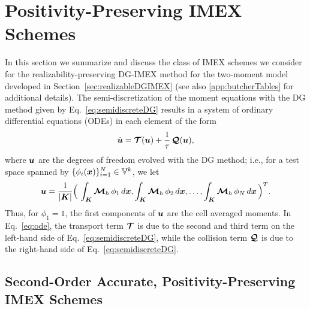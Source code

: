 \section{Positivity-Preserving IMEX Schemes}
\label{sec:imex}

In this section we summarize and discuss the class of IMEX schemes we consider for the realizability-preserving DG-IMEX method for the two-moment model developed in Section~\ref{sec:realizableDGIMEX} (see also \ref{app:butcherTables} for additional details).  
The semi-discretization of the moment equations with the DG method given by Eq.~\eqref{eq:semidiscreteDG} results in a system of ordinary differential equations (ODEs) in each element of the form
\begin{equation}
  \dot{\boldsymbol{u}}
  =\boldsymbol{\mathcal{T}}(\boldsymbol{u})+\frac{1}{\tau}\,\boldsymbol{\mathcal{Q}}(\boldsymbol{u}),
  \label{eq:ode}
\end{equation}
where $\boldsymbol{u}$ are the degrees of freedom evolved with the DG method; i.e., for a test space spanned by $\{\phi_{i}(\boldsymbol{x})\}_{i=1}^{N}\in\mathbb{V}^{k}$, we let
\begin{equation}
  \boldsymbol{u}=\frac{1}{|\boldsymbol{K}|}\Big(\,\int_{\boldsymbol{K}}\boldsymbol{\mathcal{M}}_{h}\,\phi_{1}\,d\boldsymbol{x},\int_{\boldsymbol{K}}\boldsymbol{\mathcal{M}}_{h}\,\phi_{2}\,d\boldsymbol{x},\ldots,\int_{\boldsymbol{K}}\boldsymbol{\mathcal{M}}_{h}\,\phi_{N}\,d\boldsymbol{x}\,\Big)^{T}.
\end{equation}
Thus, for $\phi_{1}=1$, the first components of $\boldsymbol{u}$ are the cell averaged moments.  
In Eq.~\eqref{eq:ode}, the transport term $\boldsymbol{\mathcal{T}}$ is due to the second and third term on the left-hand side of Eq.~\eqref{eq:semidiscreteDG}, while the collision term $\boldsymbol{\mathcal{Q}}$ is due to the right-hand side of Eq.~\eqref{eq:semidiscreteDG}.  

\subsection{Second-Order Accurate, Positivity-Preserving IMEX Schemes}

